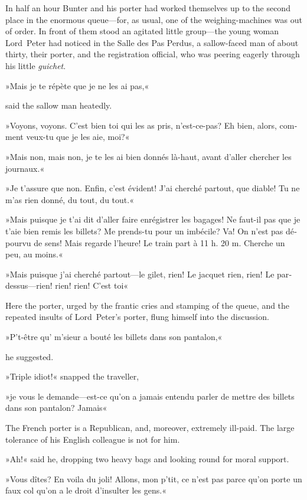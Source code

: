 In half an hour Bunter and his porter had worked themselves up to the second place in the enormous queue—for, as usual, one of the weighing-machines was out of order. In front of them stood an agitated little group—the young woman Lord~Peter had noticed in the Salle des Pas Perdus, a sallow-faced man of about thirty, their porter, and the registration official, who was peering eagerly through his little \textit{guichet}.

\begin{french}»Mais je te répète que je ne les ai pas,« \end{french} said the sallow man heatedly. \begin{french}»Voyons, voyons. C'est bien toi qui les as pris, n'est-ce-pas? Eh bien, alors, comment veux-tu que je les aie, moi?«

»Mais non, mais non, je te les ai bien donnés là-haut, avant d'aller chercher les journaux.«

»Je t'assure que non. Enfin, c'est évident! J'ai cherché partout, que diable! Tu ne m'as rien donné, du tout, du tout.«

»Mais puisque je t'ai dit d'aller faire enrégistrer les bagages! Ne faut-il pas que je t'aie bien remis les billets? Me prends-tu pour un imbécile? Va! On n'est pas dépourvu de sens! Mais regarde l'heure! Le train part à 11 h. 20 m. Cherche un peu, au moins.«

»Mais puisque j'ai cherché partout—le gilet, rien! Le jacquet rien, rien! Le pardessus—rien! rien! rien! C'est toi\longdash«
\end{french}

Here the porter, urged by the frantic cries and stamping of the queue, and the repeated insults of Lord~Peter's porter, flung himself into the discussion.
\begin{french}»P't-être qu' m'sieur a bouté les billets dans son pantalon,«\end{french} he suggested.

»Triple idiot!« snapped the traveller, \begin{french}»je vous le demande—est-ce qu'on a jamais entendu parler de mettre des billets dans son pantalon? Jamais\longdash«\end{french}

The French porter is a Republican, and, moreover, extremely ill-paid. The large tolerance of his English colleague is not for him.

»Ah!« said he, dropping two heavy bags and looking round for moral support. \begin{french}»Vous dîtes? En voila du joli! Allons, mon p'tit, ce n'est pas parce qu'on porte un faux col qu'on a le droit d'insulter les gens.«\end{french}

